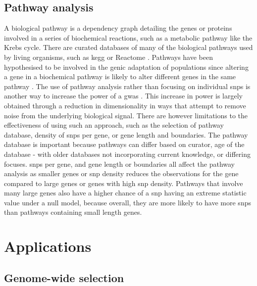 \documentclass[]{report}
\begin{document}
\subsection{Pathway analysis}\label{pathway-analysis}

A biological pathway is a dependency graph detailing the genes or
proteins involved in a series of biochemical reactions, such as a
metabolic pathway like the Krebs cycle. There are curated databases of
many of the biological pathways used by living organisms, such as
\gls{kegg} \citep{Kanehisa2017} or Reactome \citep{Fabregat2018}.
Pathways have been hypothesised to be involved in the genic adaptation
of populations since altering a gene in a biochemical pathway is likely
to alter different genes in the same pathway \citep{Bigham2010}. The use
of pathway analysis rather than focusing on individual \glspl{snp} is
another way to increase the power of a \gls{gwas} \citep{Jia2011}. This
increase in power is largely obtained through a reduction in
dimensionality in ways that attempt to remove noise from the underlying
biological signal. There are however limitations to the effectiveness of
using such an approach, such as the selection of pathway database,
density of \glspl{snp} per gene, or gene length and boundaries. The
pathway database is important because pathways can differ based on
curator, age of the database - with older databases not incorporating
current knowledge, or differing focuses. \Glspl{snp} per gene, and gene
length or boundaries all affect the pathway analysis as smaller genes or
\gls{snp} density reduces the observations for the gene compared to
large genes or genes with high \gls{snp} density. Pathways that involve
many large genes also have a higher chance of a \gls{snp} having an
extreme statistic value under a null model, because overall, they are
more likely to have more \glspl{snp} than pathways containing small
length genes.

\section{Applications}\label{applications}

\subsection{Genome-wide selection}\label{genome-wide-selection}
\end{document}
